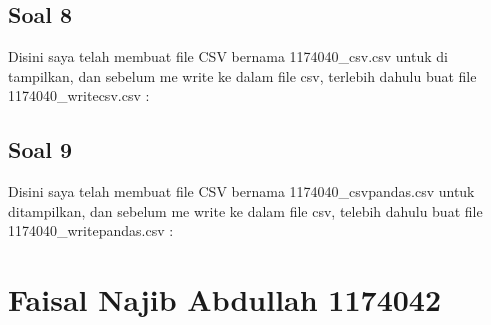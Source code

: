 \subsection{Soal 8}
Disini saya telah membuat file CSV bernama 1174040\_csv.csv untuk di tampilkan, dan sebelum me write ke dalam file csv, terlebih dahulu buat file 1174040\_writecsv.csv : 


\subsection{Soal 9}
Disini saya telah membuat file CSV bernama 1174040\_csvpandas.csv untuk ditampilkan, dan sebelum me write ke dalam file csv, telebih dahulu buat file 1174040\_writepandas.csv : 


\section{Faisal Najib Abdullah 1174042}
